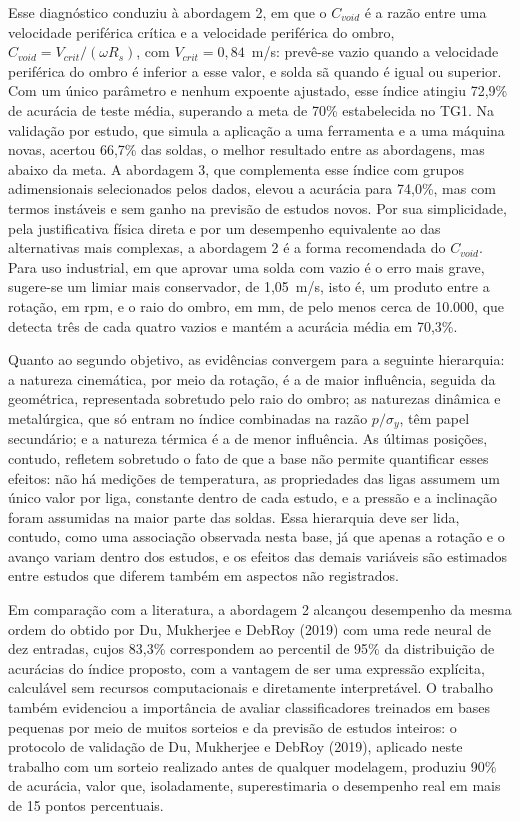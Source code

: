 \documentclass[12pt,openany]{report}
\begin{document}
Esse diagnóstico conduziu à abordagem 2, em que o $C_{void}$ é a razão entre uma velocidade periférica crítica e a velocidade periférica do ombro, $C_{void} = V_{crit}/(\omega R_s)$, com $V_{crit} = 0{,}84$~m/s: prevê-se vazio quando a velocidade periférica do ombro é inferior a esse valor, e solda sã quando é igual ou superior. Com um único parâmetro e nenhum expoente ajustado, esse índice atingiu 72,9\% de acurácia de teste média, superando a meta de 70\% estabelecida no TG1. Na validação por estudo, que simula a aplicação a uma ferramenta e a uma máquina novas, acertou 66,7\% das soldas, o melhor resultado entre as abordagens, mas abaixo da meta. A abordagem 3, que complementa esse índice com grupos adimensionais selecionados pelos dados, elevou a acurácia para 74,0\%, mas com termos instáveis e sem ganho na previsão de estudos novos. Por sua simplicidade, pela justificativa física direta e por um desempenho equivalente ao das alternativas mais complexas, a abordagem 2 é a forma recomendada do $C_{void}$. Para uso industrial, em que aprovar uma solda com vazio é o erro mais grave, sugere-se um limiar mais conservador, de 1,05~m/s, isto é, um produto entre a rotação, em rpm, e o raio do ombro, em mm, de pelo menos cerca de 10.000, que detecta três de cada quatro vazios e mantém a acurácia média em 70,3\%.

Quanto ao segundo objetivo, as evidências convergem para a seguinte hierarquia: a natureza cinemática, por meio da rotação, é a de maior influência, seguida da geométrica, representada sobretudo pelo raio do ombro; as naturezas dinâmica e metalúrgica, que só entram no índice combinadas na razão $p/\sigma_y$, têm papel secundário; e a natureza térmica é a de menor influência. As últimas posições, contudo, refletem sobretudo o fato de que a base não permite quantificar esses efeitos: não há medições de temperatura, as propriedades das ligas assumem um único valor por liga, constante dentro de cada estudo, e a pressão e a inclinação foram assumidas na maior parte das soldas. Essa hierarquia deve ser lida, contudo, como uma associação observada nesta base, já que apenas a rotação e o avanço variam dentro dos estudos, e os efeitos das demais variáveis são estimados entre estudos que diferem também em aspectos não registrados.

Em comparação com a literatura, a abordagem 2 alcançou desempenho da mesma ordem do obtido por Du, Mukherjee e DebRoy (2019) com uma rede neural de dez entradas, cujos 83,3\% correspondem ao percentil de 95\% da distribuição de acurácias do índice proposto, com a vantagem de ser uma expressão explícita, calculável sem recursos computacionais e diretamente interpretável. O trabalho também evidenciou a importância de avaliar classificadores treinados em bases pequenas por meio de muitos sorteios e da previsão de estudos inteiros: o protocolo de validação de Du, Mukherjee e DebRoy (2019), aplicado neste trabalho com um sorteio realizado antes de qualquer modelagem, produziu 90\% de acurácia, valor que, isoladamente, superestimaria o desempenho real em mais de 15 pontos percentuais.
\end{document}
